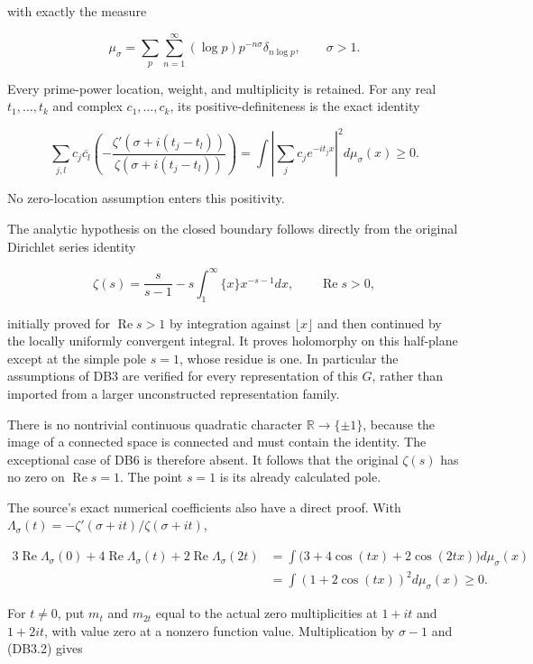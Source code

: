 \documentclass[
]{report}
\begin{document}
with exactly the measure

\[
 \mu_\sigma=\sum_{p}\sum_{n=1}^{\infty}
       (\log p)p^{-n\sigma}\delta_{n\log p},\qquad\sigma>1.
 \tag{DB9.4}
\]

Every prime-power location, weight, and multiplicity is retained. For
any real \(t_1,\ldots,t_k\) and complex \(c_1,\ldots,c_k\), its
positive-definiteness is the exact identity

\[
 \sum_{j,l}c_j\overline{c_l}
  \left(-\frac{\zeta'(\sigma+i(t_j-t_l))}
                  {\zeta(\sigma+i(t_j-t_l))}\right)
   =\int\left|\sum_jc_je^{-it_jx}\right|^2d\mu_\sigma(x)\geq0.
 \tag{DB9.5}
\]

No zero-location assumption enters this positivity.

The analytic hypothesis on the closed boundary follows directly from the
original Dirichlet series identity

\[
 \zeta(s)=\frac{s}{s-1}
           -s\int_1^\infty\{x\}x^{-s-1}dx,
            \qquad\operatorname{Re}s>0,
 \tag{DB9.6}
\]

initially proved for \(\operatorname{Re}s>1\) by integration against
\(\lfloor x\rfloor\) and then continued by the locally uniformly
convergent integral. It proves holomorphy on this half-plane except at
the simple pole \(s=1\), whose residue is one. In particular the
assumptions of DB3 are verified for every representation of this \(G\),
rather than imported from a larger unconstructed representation family.

There is no nontrivial continuous quadratic character
\(\mathbb R\to\{\pm1\}\), because the image of a connected space is
connected and must contain the identity. The exceptional case of DB6 is
therefore absent. It follows that the original \(\zeta(s)\) has no zero
on \(\operatorname{Re}s=1\). The point \(s=1\) is its already calculated
pole.

The source's exact numerical coefficients also have a direct proof. With
\(\Lambda_\sigma(t)=-\zeta'(\sigma+it)/\zeta(\sigma+it)\),

\[
\begin{aligned}
 3\operatorname{Re}\Lambda_\sigma(0)
 +4\operatorname{Re}\Lambda_\sigma(t)
 +2\operatorname{Re}\Lambda_\sigma(2t)
 &=\int\bigl(3+4\cos(tx)+2\cos(2tx)\bigr)d\mu_\sigma(x)\\
 &=\int(1+2\cos(tx))^2d\mu_\sigma(x)\geq0.
\end{aligned}
 \tag{DB9.7}
\]

For \(t\ne0\), put \(m_t\) and \(m_{2t}\) equal to the actual zero
multiplicities at \(1+it\) and \(1+2it\), with value zero at a nonzero
function value. Multiplication by \(\sigma-1\) and (DB3.2) gives
\end{document}
